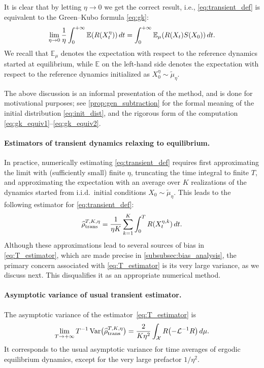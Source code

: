 \documentclass[11pt]{article}
\newcommand{\E}{\mathbb{E}}
\renewcommand{\L}{\mathcal{L}}
\DeclareMathOperator{\Var}{Var}
\DeclarePairedDelimiter\paren{\lparen}{\rparen}
\theoremstyle{definition}
\let\oldparagraph=\paragraph
\renewcommand\paragraph[1]{\oldparagraph{#1.}}
\newcommand{\psip}{\widetilde{\mu}_\eta}
\newcommand{\estTmp}{\widehat{\rho}}
\newcommand{\Test}{\estTmp^{T,K,\eta}_{\rm trans}} %
\begin{document}
It is clear that by letting $\eta\to 0$ we get the correct result, i.e., \eqref{eq:transient_def} is equivalent to the Green--Kubo formula \eqref{eq:gk}:
\begin{equation}
    \notag
	\lim_{\eta\to 0}\frac{1}{\eta}\int_0^{+\infty} \E(R(X_t^\eta)) \, dt = \int_0^{+\infty} \E_\mu(R(X_t) S(X_0)) \, dt.
\end{equation}
We recall that $\E_\mu$ denotes the expectation with respect to the reference dynamics started at equilibrium, while $\E$ on the left-hand side denotes the expectation with respect to the reference dynamics initialized as $X_0^\eta \sim \psip$.

The above discussion is an informal presentation of the method, and is done for motivational purposes; see \cref{prop:gen_subtraction} for the formal meaning of the initial distribution \eqref{eq:init_dist}, and the rigorous form of the computation \eqref{eq:gk_equiv1}--\eqref{eq:gk_equiv2}.  

\paragraph{Estimators of transient dynamics relaxing to equilibrium} In practice, numerically estimating \eqref{eq:transient_def} requires first approximating the limit with (sufficiently small) finite $\eta$, truncating the time integral to finite $T$, and approximating the expectation with an average over $K$ realizations of the dynamics started from i.i.d.\ initial conditions $X_0\sim\psip$. This leads to the following estimator for \eqref{eq:transient_def}:
\begin{equation}
	\Test = \frac{1}{\eta K}\sum_{k=1}^K \int_0^T R(X_t^{\eta,k}) \, dt.	
	\label{eq:T_estimator}
\end{equation}
Although these approximations lead to several sources of bias in \eqref{eq:T_estimator}, which are made precise in \cref{subsubsec:bias_analysis}, the primary concern associated with \eqref{eq:T_estimator} is its very large variance, as we discuss next. This disqualifies it as an appropriate numerical method.

\paragraph{Asymptotic variance of usual transient estimator} The asymptotic variance of the estimator~\eqref{eq:T_estimator} is
\begin{equation}
    \notag
	\lim_{T\to+\infty} T^{-1}\Var\bigl(\Test\bigr) = \frac{2}{K\eta^2}\int_\mathcal{X} R\paren*{-\L^{-1} R} \, d\mu.
\end{equation}
It corresponds to the usual asymptotic variance for time averages of ergodic equilibrium dynamics, except for the very large prefactor $1/\eta^2$. 
\end{document}
